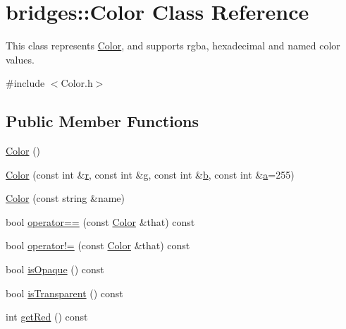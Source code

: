 \hypertarget{classbridges_1_1_color}{}\section{bridges\+::Color Class Reference}
\label{classbridges_1_1_color}


This class represents \mbox{\hyperlink{classbridges_1_1_color}{Color}}, and supports rgba, hexadecimal and named color values.  




{\ttfamily \#include $<$Color.\+h$>$}

\subsection*{Public Member Functions}
\begin{DoxyCompactItemize}
\item 
\mbox{\hyperlink{classbridges_1_1_color_ab89df8fea283d33585380ea91d78bbee}{Color}} ()
\item 
\mbox{\hyperlink{classbridges_1_1_color_aa861c0dc7729008cc4f886f235198181}{Color}} (const int \&\mbox{\hyperlink{namespacebridges_acfb0a4f7877d8f63de3e6862004c50eda4b43b0aee35624cd95b910189b3dc231}{r}}, const int \&\mbox{\hyperlink{namespacebridges_acfb0a4f7877d8f63de3e6862004c50edab2f5ff47436671b6e533d8dc3614845d}{g}}, const int \&\mbox{\hyperlink{namespacebridges_acfb0a4f7877d8f63de3e6862004c50eda92eb5ffee6ae2fec3ad71c777531578f}{b}}, const int \&\mbox{\hyperlink{namespacebridges_acfb0a4f7877d8f63de3e6862004c50eda0cc175b9c0f1b6a831c399e269772661}{a}}=255)
\item 
\mbox{\hyperlink{classbridges_1_1_color_a813c6cb59aad0883bcc12305fa6049cc}{Color}} (const string \&name)
\item 
bool \mbox{\hyperlink{classbridges_1_1_color_a9b33b4ee063496691f8816504cc8b007}{operator==}} (const \mbox{\hyperlink{classbridges_1_1_color}{Color}} \&that) const
\item 
bool \mbox{\hyperlink{classbridges_1_1_color_abe4ff1e5d4c6a33b2e9715be57ae0dce}{operator!=}} (const \mbox{\hyperlink{classbridges_1_1_color}{Color}} \&that) const
\item 
bool \mbox{\hyperlink{classbridges_1_1_color_ae55f3077cb3bd93386dc11eaeecf823c}{is\+Opaque}} () const
\item 
bool \mbox{\hyperlink{classbridges_1_1_color_a56b0d17239aafa0cea7f43e5358cf4c0}{is\+Transparent}} () const
\item 
int \mbox{\hyperlink{classbridges_1_1_color_a4c81e33854a6fdba9a3030e97ec8609e}{get\+Red}} () const

\end{DoxyCompactItemize}
